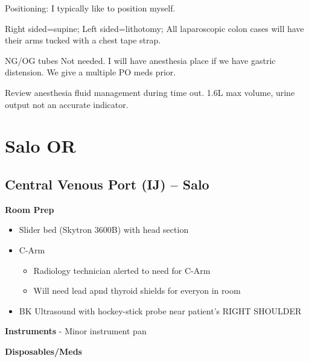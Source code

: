 \documentclass[
]{book}
\providecommand{\tightlist}{%
  \setlength{\itemsep}{0pt}\setlength{\parskip}{0pt}}
\begin{document}
Positioning: I typically like to position myself.

Right sided=supine; Left sided=lithotomy; All laparoscopic colon cases will have their arms tucked with a chest tape strap.

NG/OG tubes Not needed. I will have anesthesia place if we have gastric distension. We give a multiple PO meds prior.

Review anesthesia fluid management during time out. 1.6L max volume, urine output not an accurate indicator.

\hypertarget{part-salo-or}{%
\part*{Salo OR}\label{part-salo-or}}

\hypertarget{cv_port_salo}{%
\chapter{Central Venous Port (IJ) -- Salo}\label{cv_port_salo}}

\textbf{Room Prep}

\begin{itemize}
\tightlist
\item
  Slider bed (Skytron 3600B) with head section
\item
  C-Arm

  \begin{itemize}
  \tightlist
  \item
    Radiology technician alerted to need for C-Arm
  \item
    Will need lead apnd thyroid shields for everyon in room
  \end{itemize}
\item
  BK Ultrasound with hockey-stick probe near patient's RIGHT SHOULDER
\end{itemize}

\textbf{Instruments}
- Minor instrument pan

\textbf{Disposables/Meds}
\end{document}

